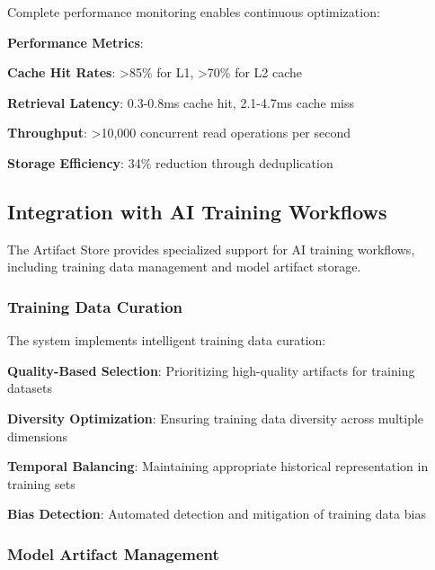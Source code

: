 Complete performance monitoring enables continuous optimization:

\begin{alertbox}
\textbf{Performance Metrics}:
\begin{compactlist}
    \item \textbf{Cache Hit Rates}: >85\% for L1, >70\% for L2 cache
    \item \textbf{Retrieval Latency}: 0.3-0.8ms cache hit, 2.1-4.7ms cache miss
    \item \textbf{Throughput}: >10,000 concurrent read operations per second
    \item \textbf{Storage Efficiency}: 34\% reduction through deduplication
\end{compactlist}
\end{alertbox}

\subsection*{Integration with AI Training Workflows}

The Artifact Store provides specialized support for AI training workflows, including training data management and model artifact storage.

\subsubsection*{Training Data Curation}

The system implements intelligent training data curation:

\begin{compactlist}
    \item \textbf{Quality-Based Selection}: Prioritizing high-quality artifacts for training datasets
    \item \textbf{Diversity Optimization}: Ensuring training data diversity across multiple dimensions
    \item \textbf{Temporal Balancing}: Maintaining appropriate historical representation in training sets
    \item \textbf{Bias Detection}: Automated detection and mitigation of training data bias
\end{compactlist}

\subsubsection*{Model Artifact Management}

